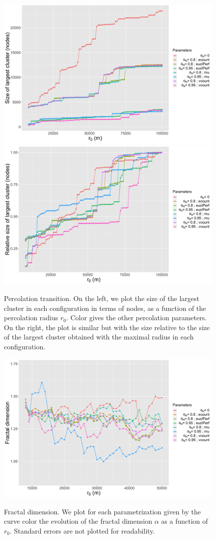 \documentclass{jimis-en}
\begin{document}
\begin{figure}[ht] 
  {\includegraphics[width=0.49\linewidth]{figures/abssize_nodes.png}}
  {\includegraphics[width=0.49\linewidth]{figures/relsize_nodes.png}}
  \centering
  \caption{Percolation transition. On the left, we plot the size of the largest cluster in each configuration in terms of nodes, as a function of the percolation radius $r_0$. Color gives the other percolation parameters. On the right, the plot is similar but with the size relative to the size of the largest cluster obtained with the maximal radius in each configuration.\label{fig:percolation}}
\end{figure}

\begin{figure}[ht] 
  {\includegraphics[width=\linewidth]{figures/fractaldimension.png}}
  \centering
  \caption{Fractal dimension. We plot for each parametrization given by the curve color the evolution of the fractal dimension $\alpha$ as a function of $r_0$. Standard errors are not plotted for readability.\label{fig:fractaldim}}
\end{figure}
\end{document}
